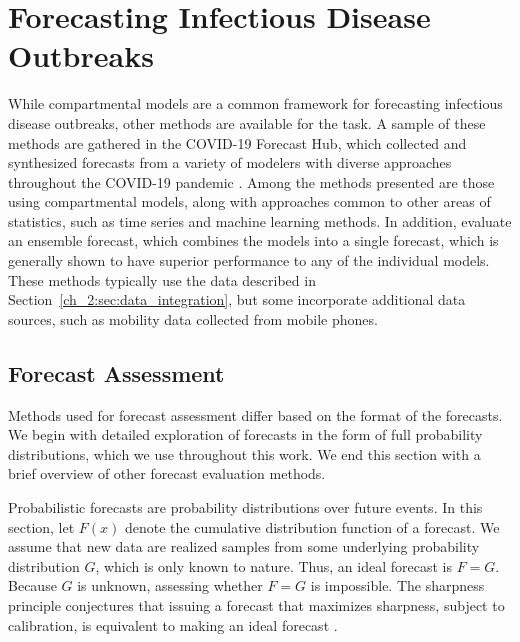 \section{Forecasting Infectious Disease Outbreaks}
\label{sec:forecasting_techniques_and_assessment}

While compartmental models are a common framework for forecasting infectious disease outbreaks, other methods are available for the task.
A sample of these methods are gathered in the COVID-19 Forecast Hub, which collected and synthesized forecasts from a variety of modelers with diverse approaches throughout the COVID-19 pandemic \citep{Cramer2022Evaluation}.
Among the methods presented are those using compartmental models, along with approaches common to other areas of statistics, such as time series and machine learning methods.
In addition, \citet{Cramer2022Evaluation} evaluate an ensemble forecast, which combines the models into a single forecast, which is generally shown to have superior performance to any of the individual models.
These methods typically use the data described in Section~\ref{ch_2:sec:data_integration}, but some incorporate additional data sources, such as mobility data collected from mobile phones.

\subsection{Forecast Assessment}

Methods used for forecast assessment differ based on the format of the forecasts.
We begin with detailed exploration of forecasts in the form of full probability distributions, which we use throughout this work.
We end this section with a brief overview of other forecast evaluation methods.

Probabilistic forecasts are probability distributions over future events.
In this section, let \( F(x) \) denote the cumulative distribution function of a forecast.
We assume that new data are realized samples from some underlying probability distribution \( G \), which is only known to nature.
Thus, an ideal forecast is \( F = G \).
Because \( G \) is unknown, assessing whether \(F = G\) is impossible.
The sharpness principle conjectures that issuing a forecast that maximizes sharpness, subject to calibration, is equivalent to making an ideal forecast \citep{Gneiting2007Probabilistic}.

